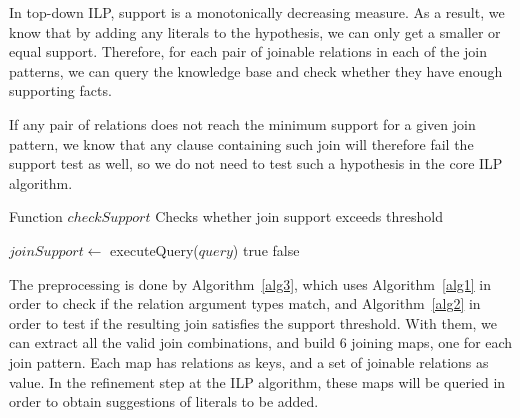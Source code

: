 In top-down ILP, support is a monotonically decreasing measure. As a result, we know that by adding any
literals to the hypothesis, we can only get a smaller or equal support. Therefore, for each pair of joinable relations
in each of the join patterns, we can query the knowledge base and check whether they have enough supporting facts.

If any pair of relations does not reach the minimum support for a given join pattern, we know that any clause
containing such join will therefore fail the support test as well, so we do not need to test such a hypothesis in the
core ILP algorithm.

\begin{algorithm}[h!]
  \caption{Function $checkSupport$ \newline Checks whether join support exceeds threshold}
     {
    }
    $joinSupport \leftarrow$ executeQuery($query$)\;
      {
      \Return true\;
    }{
      \Return false\;
    }
  \label{alg2}
\end{algorithm}


The preprocessing is done by Algorithm~\ref{alg3}, which uses Algorithm~\ref{alg1} in order to check if
the relation argument types match, and Algorithm~\ref{alg2} in order to test if the resulting join satisfies the
support threshold. With them, we can extract all the valid join combinations, and build 6 joining maps, one for each
join pattern. Each map has relations as keys, and a set of joinable relations as value. In the refinement step at the
ILP algorithm, these maps will be queried in order to obtain suggestions of literals to be
added.

